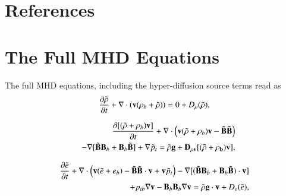 \documentclass[final,1p]{elsarticle}
\begin{document}


\section{References}

%





\appendix
\section{ The Full MHD Equations}




 The full MHD equations, including the hyper-diffusion source terms read as
\begin{equation}\label{eqprho}
{{\partial \tilde{\rho}}\over{\partial t}}+\nabla\cdot\left( {\bf v}(\rho_{b} + \tilde{\rho})\right)=0+D_{\rho}(\tilde{\rho}),
\end{equation}




\begin{eqnarray}\label{eqpmom}\nonumber
&&{{\partial [ (\tilde{\rho}+\rho_{b} ) {\bf v}]}\over{\partial t}}+\nabla\cdot\left( {\bf v}(\tilde{\rho} +\rho_{b}){\bf v}-{\bf \tilde{B} \tilde{B}} \right)\\ 
                               && -\nabla [\tilde{\bf B}{\bf B}_{b}+{\bf B}_{b}\tilde{\bf B}] +\nabla \tilde{p}_{t} =\tilde{\rho}{\bf g}+\bf{D}_{\rho v}[(\tilde{\rho }+\rho_{b})\bf v],
\end{eqnarray}

\begin{eqnarray}\label{eqpe}\nonumber
{{\partial \tilde{e}}\over{\partial t}}+\nabla\cdot\left({\bf v}(\tilde{e}+e_{b})-{\tilde{\bf B} \tilde{\bf B}}\cdot{\bf v}+{\bf v}\tilde{p}_{t}\right)-\nabla [(\tilde{\bf B}{\bf B}_{b}+{\bf B}_{b}\tilde{\bf B})\cdot\bf v]\\
+p_{tb}\nabla {\bf v}-{\bf B}_{b}{\bf B}_{b}\nabla {\bf v}=\tilde{\rho}{\bf g}\cdot{\bf v}+D_{e}(\tilde{e}),
\end{eqnarray}
\end{document}
